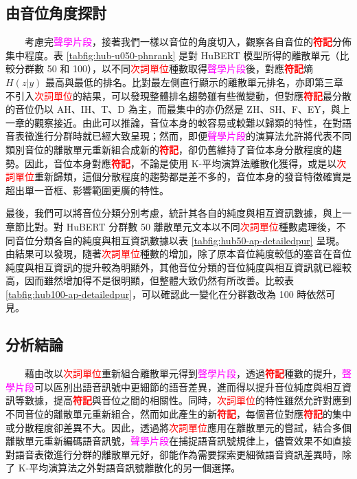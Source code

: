 \subsection{由音位角度探討}

　　考慮完\textcolor{magenta}{聲學片段}，接著我們一樣以音位的角度切入，觀察各自音位的\textbf{\textcolor{red}{符記}}分佈集中程度。表 \ref{tabfig:hub-u050-phnrank} 是對 HuBERT 模型所得的離散單元（比較分群數 50 和 100），以不同\textcolor{red}{次詞單位}種數取得\textcolor{magenta}{聲學片段}後，對應\textbf{\textcolor{red}{符記}}熵 $H(z|y)$ 最高與最低的排名。比對最左側直行顯示的離散單元排名，亦即第三章不引入\textcolor{red}{次詞單位}的結果，可以發現整體排名趨勢雖有些微變動，但對應\textbf{\textcolor{red}{符記}}最分散的音位仍以 AH、IH、T、D 為主，而最集中的亦仍然是 ZH、SH、F、EY，與上一章的觀察接近。由此可以推論，音位本身的較容易或較難以歸類的特性，在對語音表徵進行分群時就已經大致呈現；然而，即便\textcolor{magenta}{聲學片段}的演算法允許將代表不同類別音位的離散單元重新組合成新的\textbf{\textcolor{red}{符記}}，卻仍舊維持了音位本身分散程度的趨勢。因此，音位本身對應\textbf{\textcolor{red}{符記}}，不論是使用 K-平均演算法離散化獲得，或是以\textcolor{red}{次詞單位}重新歸類，這個分散程度的趨勢都是差不多的，音位本身的發音特徵確實是超出單一音框、影響範圍更廣的特性。 
  
        最後，我們可以將音位分類分別考慮，統計其各自的純度與相互資訊數據，與上一章節比對。對 HuBERT 分群數 50 離散單元文本以不同\textcolor{red}{次詞單位}種數處理後，不同音位分類各自的純度與相互資訊數據以表 \ref{tabfig:hub50-ap-detailedpur} 呈現。由結果可以發現，隨著\textcolor{red}{次詞單位}種數的增加，除了原本音位純度較低的塞音在音位純度與相互資訊的提升較為明顯外，其他音位分類的音位純度與相互資訊就已經較高，因而雖然增加得不是很明顯，但整體大致仍然有所改善。比較表 \ref{tabfig:hub100-ap-detailedpur}，可以確認此一變化在分群數改為 100 時依然可見。

\subsection{分析結論}

　　藉由改以\textcolor{red}{次詞單位}重新組合離散單元得到\textcolor{magenta}{聲學片段}，透過\textbf{\textcolor{red}{符記}}種數的提升，\textcolor{magenta}{聲學片段}可以區別出語音訊號中更細節的語音差異，進而得以提升音位純度與相互資訊等數據，提高\textbf{\textcolor{red}{符記}}與音位之間的相關性。同時，\textcolor{red}{次詞單位}的特性雖然允許對應到不同音位的離散單元重新組合，然而如此產生的新\textbf{\textcolor{red}{符記}}，每個音位對應\textbf{\textcolor{red}{符記}}的集中或分散程度卻差異不大。因此，透過將\textcolor{red}{次詞單位}應用在離散單元的嘗試，結合多個離散單元重新編碼語音訊號，\textcolor{magenta}{聲學片段}在捕捉語音訊號規律上，儘管效果不如直接對語音表徵進行分群的離散單元好，卻能作為需要探索更細微語音資訊差異時，除了 K-平均演算法之外對語音訊號離散化的另一個選擇。

